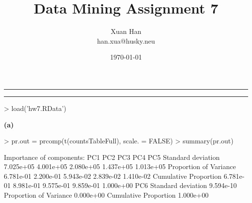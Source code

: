\documentclass[a4paper]{article}
\makeatletter
\newcommand{\question}[2] {\vspace{.25in} \hrule\vspace{0.5em}
\noindent{\bf #1: #2} \vspace{0.5em}
\hrule \vspace{.10in}}
\renewcommand{\part}[1] {\vspace{.10in} {\bf (#1)}}
\newcommand{\myname}{Xuan Han}
\newcommand{\myhusky}{han.xua@husky.neu}
\newcommand{\myhwnum}{7}
\makeatother
\begin{document}


\title{Data Mining Assignment \myhwnum}
\author{\myname \\
        \myhusky}
\date{\today}
\maketitle

\thispagestyle{plain}


\question{1}{PCA}
\begin{Schunk}
\begin{Sinput}
> load('hw7.RData')
\end{Sinput}
\end{Schunk}

\part{a}
\begin{Schunk}
\begin{Sinput}
> pr.out = prcomp(t(countsTableFull), scale. = FALSE)
> summary(pr.out)
\end{Sinput}
\begin{Soutput}
Importance of components:
                             PC1       PC2       PC3       PC4       PC5
Standard deviation     7.025e+05 4.001e+05 2.080e+05 1.437e+05 1.013e+05
Proportion of Variance 6.781e-01 2.200e-01 5.943e-02 2.839e-02 1.410e-02
Cumulative Proportion  6.781e-01 8.981e-01 9.575e-01 9.859e-01 1.000e+00
                             PC6
Standard deviation     9.594e-10
Proportion of Variance 0.000e+00
Cumulative Proportion  1.000e+00
\end{Soutput}
\end{Schunk}
\end{document}
